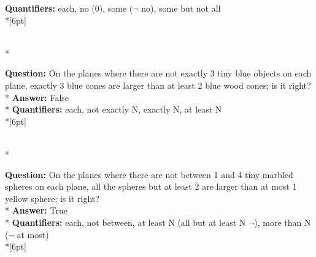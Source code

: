 \begin{figure*}
\begin{minipage}{0.48\textwidth}
\begin{minipage}[t][2.2cm][t]{1\textwidth}
      \textbf{Quantifiers:} each, no (0), some ($\neg$ no), some but not all \\*[6pt]
    \end{minipage}\\*
    \begin{minipage}[t][2.2cm][t]{1\textwidth}
      \footnotesize
      \textbf{Question:}  On the planes where there are not exactly 3 tiny blue objects on each plane, exactly 3 blue cones are larger than at least 2 blue wood cones; is it right? \\*
      \textbf{Answer:}  False \\*
      \textbf{Quantifiers:} each, not exactly N, exactly N, at least N \\*[6pt]
    \end{minipage}\\*
    \begin{minipage}[t][2.2cm][t]{1\textwidth}
      \footnotesize
      \textbf{Question:} On the planes where there are not between 1 and 4 tiny marbled spheres on each plane, all the spheres but at least 2 are larger than at most 1 yellow sphere; is it right? \\*
      \textbf{Answer:} True \\*
      \textbf{Quantifiers:} each, not between, at least N (all but at least N $\neg$), more than N ($\neg$ at most) \\*[6pt]
    \end{minipage}
  \end{minipage}
  \vspace{0.2cm}
  

\end{figure*}
